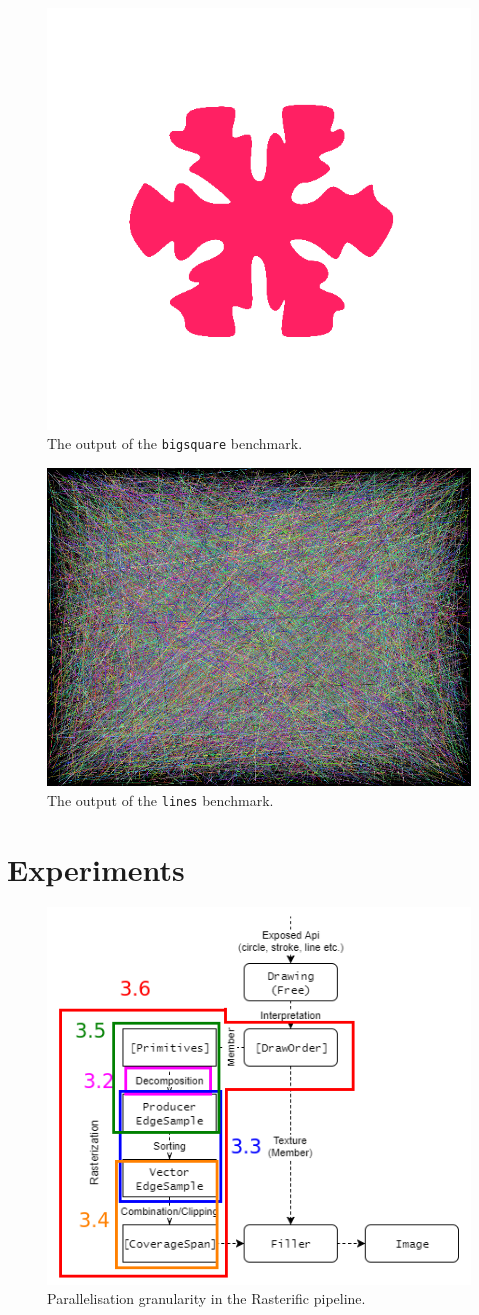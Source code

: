 \documentclass[12pt]{beamer}
\begin{document}
\begin{frame}
\begin{figure}[H]
  \centering
  \includegraphics[width=.2\linewidth]{../bigsquare}
  \caption{The output of the \texttt{bigsquare} benchmark.}
  \label{fig:bigsquare-benchmark}
\end{figure}
\end{frame}

\begin{frame}
\begin{figure}[H]
  \centering
  \includegraphics[width=.4\linewidth]{../lines}
  \caption{The output of the \texttt{lines} benchmark.}
  \label{fig:lines-benchmark}
\end{figure}
\end{frame}

\section{Experiments}\label{experiments}

\begin{frame}
\begin{figure}[H]
  \centering
  \includegraphics[width=.6\linewidth]{../rasterific-pipeline-flot}
  \caption{Parallelisation granularity in the Rasterific pipeline.}
  \label{fig:rasterific-pipeline-flot}
\end{figure}
\end{frame}
\end{document}
